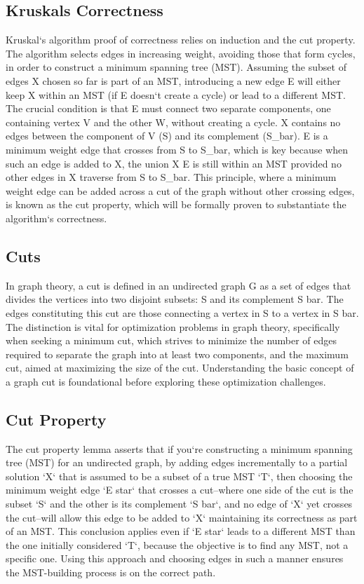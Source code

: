 \subsection*{Kruskals  Correctness}
Kruskal`s algorithm proof of correctness relies on induction and the cut property.
The algorithm selects edges in increasing weight, avoiding those that form cycles, in order to construct a minimum spanning tree (MST).
Assuming the subset of edges X chosen so far is part of an MST, introducing a new edge E will either keep X within an MST (if E doesn`t create a cycle) or lead to a different MST\@.
The crucial condition is that E must connect two separate components, one containing vertex V and the other W, without creating a cycle.
X contains no edges between the component of V (S) and its complement (S\_bar).
E is a minimum weight edge that crosses from S to S\_bar, which is key because when such an edge is added to X, the union X  E is still within an MST provided no other edges in X traverse from S to S\_bar.
This principle, where a minimum weight edge can be added across a cut of the graph without other crossing edges, is known as the cut property, which will be formally proven to substantiate the algorithm`s correctness.

\subsection*{Cuts}
In graph theory, a cut is defined in an undirected graph G as a set of edges that divides the vertices into two disjoint subsets: S and its complement S bar.
The edges constituting this cut are those connecting a vertex in S to a vertex in S bar.
The distinction is vital for optimization problems in graph theory, specifically when seeking a minimum cut, which strives to minimize the number of edges required to separate the graph into at least two components, and the maximum cut, aimed at maximizing the size of the cut.
Understanding the basic concept of a graph cut is foundational before exploring these optimization challenges.

\subsection*{Cut Property}
The cut property lemma asserts that if you`re constructing a minimum spanning tree (MST) for an undirected graph, by adding edges incrementally to a partial solution `X` that is assumed to be a subset of a true MST `T`, then choosing the minimum weight edge `E star` that crosses a cut--where one side of the cut is the subset `S` and the other is its complement `S bar`, and no edge of `X` yet crosses the cut--will allow this edge to be added to `X` maintaining its correctness as part of an MST\@.
This conclusion applies even if `E star` leads to a different MST than the one initially considered `T`, because the objective is to find any MST, not a specific one.
Using this approach and choosing edges in such a manner ensures the MST-building process is on the correct path.

